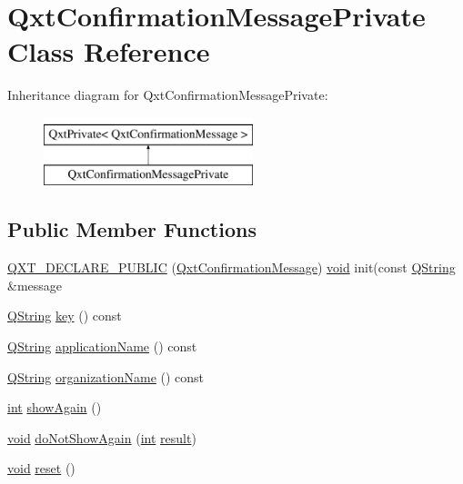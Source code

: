 \hypertarget{class_qxt_confirmation_message_private}{\section{Qxt\-Confirmation\-Message\-Private Class Reference}
\label{class_qxt_confirmation_message_private}
}
Inheritance diagram for Qxt\-Confirmation\-Message\-Private\-:\begin{figure}[H]
\begin{center}
\leavevmode
\includegraphics[height=2.000000cm]{class_qxt_confirmation_message_private}
\end{center}
\end{figure}
\subsection*{Public Member Functions}
\begin{DoxyCompactItemize}
\item 
\hyperlink{class_qxt_confirmation_message_private_a6ef544170c4c14e99a60b7fd9535b391}{Q\-X\-T\-\_\-\-D\-E\-C\-L\-A\-R\-E\-\_\-\-P\-U\-B\-L\-I\-C} (\hyperlink{class_qxt_confirmation_message}{Qxt\-Confirmation\-Message}) \hyperlink{group___u_a_v_objects_plugin_ga444cf2ff3f0ecbe028adce838d373f5c}{void} init(const \hyperlink{group___u_a_v_objects_plugin_gab9d252f49c333c94a72f97ce3105a32d}{Q\-String} \&message
\item 
\hyperlink{group___u_a_v_objects_plugin_gab9d252f49c333c94a72f97ce3105a32d}{Q\-String} \hyperlink{class_qxt_confirmation_message_private_ace7f441de42c393f977656fcc68bb5a4}{key} () const 
\item 
\hyperlink{group___u_a_v_objects_plugin_gab9d252f49c333c94a72f97ce3105a32d}{Q\-String} \hyperlink{class_qxt_confirmation_message_private_ad36b0d82893ca9bb1d18fc1a6e341d66}{application\-Name} () const 
\item 
\hyperlink{group___u_a_v_objects_plugin_gab9d252f49c333c94a72f97ce3105a32d}{Q\-String} \hyperlink{class_qxt_confirmation_message_private_a192dad079686975e3293de319ca3d0ca}{organization\-Name} () const 
\item 
\hyperlink{ioapi_8h_a787fa3cf048117ba7123753c1e74fcd6}{int} \hyperlink{class_qxt_confirmation_message_private_a45e45828ecf4cac095a71d6e16bbe729}{show\-Again} ()
\item 
\hyperlink{group___u_a_v_objects_plugin_ga444cf2ff3f0ecbe028adce838d373f5c}{void} \hyperlink{class_qxt_confirmation_message_private_a82ce878dda05284cea01c24ff3286ae0}{do\-Not\-Show\-Again} (\hyperlink{ioapi_8h_a787fa3cf048117ba7123753c1e74fcd6}{int} \hyperlink{qxtslotjob_8h_aab161efab0511ea9612b64c40e9852ca}{result})
\item 
\hyperlink{group___u_a_v_objects_plugin_ga444cf2ff3f0ecbe028adce838d373f5c}{void} \hyperlink{class_qxt_confirmation_message_private_ad8e62213eb1b07cde0e35b3647efa6cb}{reset} ()
\end{DoxyCompactItemize}
